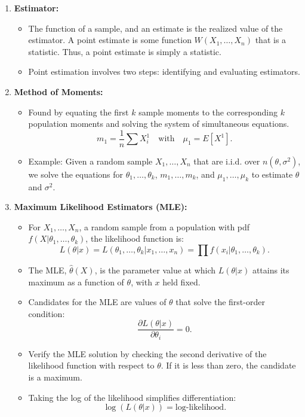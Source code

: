 \documentclass{article}
\begin{document}
\begin{enumerate}
    \item \textbf{Estimator:}
    \begin{itemize}
        \item The function of a sample, and an estimate is the realized value of the estimator. A point estimate is some function \(W(X_1, \dots, X_n)\) that is a statistic. Thus, a point estimate is simply a statistic.
        \item Point estimation involves two steps: identifying and evaluating estimators.
    \end{itemize}

    \item \textbf{Method of Moments:}
    \begin{itemize}
        \item Found by equating the first \(k\) sample moments to the corresponding \(k\) population moments and solving the system of simultaneous equations.
        \[
        m_1 = \frac{1}{n} \sum X_i^1 \quad \text{with} \quad \mu_1 = E[X^1].
        \]
        \item Example: Given a random sample \(X_1, \dots, X_n\) that are i.i.d. over \(n(\theta, \sigma^2)\), we solve the equations for \(\theta_1, \dots, \theta_k\), \(m_1, \dots, m_k\), and \(\mu_1, \dots, \mu_k\) to estimate \(\theta\) and \(\sigma^2\).
    \end{itemize}

    \item \textbf{Maximum Likelihood Estimators (MLE):}
    \begin{itemize}
        \item For \(X_1, \dots, X_n\), a random sample from a population with pdf \(f(X|\theta_1, \dots, \theta_k)\), the likelihood function is:
        \[
        L(\theta|x) = L(\theta_1, \dots, \theta_k|x_1, \dots, x_n) = \prod f(x_i|\theta_1, \dots, \theta_k).
        \]
        \item The MLE, \(\hat{\theta}(X)\), is the parameter value at which \(L(\theta|x)\) attains its maximum as a function of \(\theta\), with \(x\) held fixed.
        \item Candidates for the MLE are values of \(\theta\) that solve the first-order condition:
        \[
        \frac{\partial L(\theta|x)}{\partial \theta_i} = 0.
        \]
        \item Verify the MLE solution by checking the second derivative of the likelihood function with respect to \(\theta\). If it is less than zero, the candidate is a maximum.
        \item Taking the log of the likelihood simplifies differentiation:
        \[
        \log(L(\theta|x)) = \text{log-likelihood}.
        \]
    \end{itemize}


\end{enumerate}
\end{document}
